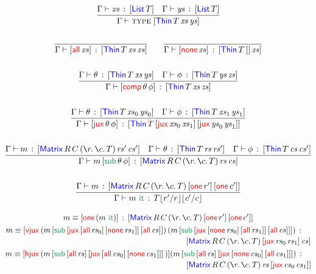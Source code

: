 \documentclass[12pt, a4paper]{article}
\newcommand{\bsl}{\texttt{\symbol{92}}}
\newcommand{\Type}{\textsc{type}\;}
\newcommand{\Nil}{\mathbf{[]}}
\newcommand{\sub}{\mathsf{sub}}
\newcommand{\itAtom}{\mathsf{it}}
\newcommand{\gp}{\,}
\newcommand{\forms}[3]{
  \ifthenelse{\equal{{#2}}{}}
  {\textcolor{#3}{\gp {#1}}}
  {[\textcolor{#3}{#1}\gp {#2}]}
}
\newcommand{\elim}[2]{\forms{#1}{#2}{ForestGreen}}
\newcommand{\elimOne}[1]{\gp \textcolor{ForestGreen}{#1}}
\newcommand{\subst}[2]{{#1}\lfloor {#2} \rfloor}
\newcommand{\substfor}[3]{\subst{#1}{ {#2} / {#3} }}
\newcommand{\C}[1]{\textcolor{red}{\mathsf{#1}}}
\newcommand{\D}[1]{\textcolor{blue}{\mathsf{#1}}}
\newcommand{\one}[1]{[ \C{one} \gp  {#1} ]}
\newcommand{\List}[1]{[ \D{List} \gp {#1} ]}
\newcommand{\Matrix}[7]{[ \D{Matrix} \gp {#1} \gp {#2} \gp ( \la{#3}\la{#4} {#5}) \gp {#6} \gp {#7}]}
\newcommand{\MRCT}[2]{\Matrix{R}{C}{r}{c}{T}{#1}{#2}}
\newcommand{\jux}[2]{[ \C{jux} \gp {#1} \gp {#2}]}
\newcommand{\hjux}[2]{[ \C{hjux} \gp {#1} \gp {#2}]}
\newcommand{\vjux}[2]{[ \C{vjux} \gp {#1} \gp {#2}]}
\newcommand{\Thin}[3]{[ \D{Thin} \gp {#1} \gp {#2} \gp {#3} ]}
\newcommand{\thAll}[1]{[ \C{all} \gp {#1}]}
\newcommand{\thNone}[1]{[ \C{none} \gp {#1}]}
\newcommand{\thComp}[2]{[ \C{comp} \gp {#1} \gp {#2}]}
\newcommand{\thJux}[2]{[ \C{jux} \gp {#1} \gp {#2}]}
\newcommand{\subElim}[3]{{#1} \gp \elim{\sub}{{#2} \gp {#3}}}
\newcommand{\itElim}[1]{{#1} \gp \elimOne{\itAtom}}
\newcommand{\ctxType}[2]{{#1} \vdash \Type {#2}}
\newcommand{\hasType}[3]{{#1} \vdash {#2} \hab {#3}}
\newcommand{\eqJ}[3]{{#1} \equiv {#2} \hab {#3}}
\newcommand{\eqJlong}[3]{
 \begin{multlined}
   {#1} \equiv {#2} \hab \\ {#3}
 \end{multlined} }
\newcommand{\hab}{\gp : \gp}
\newcommand{\la}[1]{\bsl{#1}.\,}
\newcommand{\V}[1]{\mathit{#1}}
\begin{document}
\begin{gather*}
  \infer{\ctxType{\Gamma}{\Thin{T}{\V{xs}}{\V{ys}}}}{\hasType{\Gamma}{\V{xs}}{\List{T}} & \hasType{\Gamma}{\V{ys}}{\List{T}}}
  \\ \\
  \infer{\hasType{\Gamma}{\thAll{\V{xs}}}{\Thin{T}{\V{xs}}{\V{xs}}}}{}
  \quad \quad
  \infer{\hasType{\Gamma}{\thNone{\V{xs}}}{\Thin{T}{\Nil}{\V{xs}}}}{}
  \\ \\
  \infer{\hasType{\Gamma}{\thComp{\theta}{\phi}}{\Thin{T}{\V{xs}}{\V{zs}}}}{\hasType{\Gamma}{\theta}{\Thin{T}{\V{xs}}{\V{ys}}} & \hasType{\Gamma}{\phi}{\Thin{T}{\V{ys}}{\V{zs}}}}
  \\ \\
  \infer{
    \hasType
      {\Gamma}
      {\thJux{\theta}{\phi}}
      {\Thin{T}{\jux{\V{xs}_0}{\V{xs}_1}}{\jux{\V{ys}_0}{\V{ys}_1}}}}
    {\hasType{\Gamma}{\theta}{\Thin{T}{\V{xs}_0}{\V{ys}_0}} & \hasType{\Gamma}{\phi}{\Thin{T}{\V{xs}_1}{\V{ys}_1}}}
  \\ \\
  \infer{\hasType{\Gamma}{\subElim{m}{\theta}{\phi}}{\MRCT{\V{rs}}{\V{cs}}}}
  { \hasType{\Gamma}{m}{\MRCT{\V{rs}'}{\V{cs}'}} &
    \hasType{\Gamma}{\theta}{\Thin{T}{\V{rs}}{\V{rs}'}} &
    \hasType{\Gamma}{\phi}{\Thin{T}{\V{cs}}{\V{cs}'}}
  }
  \\ \\
  \infer{\hasType{\Gamma}{\itElim{m}}{\substfor{\substfor{T}{r'}{r}}{c'}{c}}}{\hasType{\Gamma}{m}{\MRCT{\one{r'}}{\one{c'}}}}
\end{gather*}

\begin{gather*}
  \eqJ
    {m}
    {\one{(\itElim{m})}}
    {\MRCT{\one{r'}}{\one{c'}}}\\
  \eqJlong
    {m}
    {\vjux{(\subElim{m}{\thJux{\thAll{\V{rs}_{0}}}{\thNone{\V{rs}_{1}}}}{\thAll{\V{cs}}})}{(\subElim{m}{\thJux{\thNone{\V{rs}_{0}}}{\thAll{\V{rs}_{1}}}}{\thAll{\V{cs}}}})}
    {\MRCT{\jux{\V{rs}_{0}}{\V{rs}_{1}}}{\V{cs}}}\\
  \eqJlong
    {m}
    {\hjux{(\subElim{m}{\thAll{\V{rs}}}{\thJux{\thAll{\V{cs}_{0}}}{\thNone{\V{cs}_{1}}}}}){(\subElim{m}{\thAll{\V{rs}}}{\thJux{\thNone{\V{cs}_{0}}}{\thAll{\V{cs}_{1}}}})}}
    {\MRCT{\V{rs}}{\jux{\V{cs}_{0}}{\V{cs}_{1}}}}\\
\end{gather*}
\end{document}
